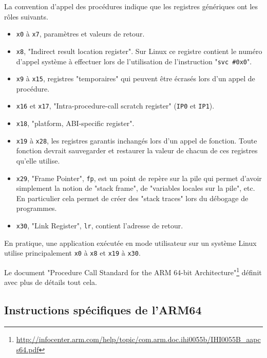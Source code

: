 \documentclass[a4paper,10pt]{article}
\begin{document}
\begin{appendices}
La convention d'appel des procédures indique que les registres génériques ont les rôles suivants.
\begin{itemize}
\item \texttt{x0} à \texttt{x7}, paramètres et valeurs de retour.
\item \texttt{x8}, "Indirect result location register". Sur Linux ce registre contient le numéro d'appel système à effectuer lors de l'utilisation de l'instruction "\texttt{svc \#0x0}".
\item \texttt{x9} à \texttt{x15}, registres "temporaires" qui peuvent être écrasés lors d'un appel de procédure.
\item \texttt{x16} et \texttt{x17}, "Intra-procedure-call scratch register" (\texttt{IP0} et \texttt{IP1}).
\item \texttt{x18}, "platform, ABI-specific register".
\item \texttt{x19} à \texttt{x28}, les registres garantis inchangés lors d'un appel de fonction. Toute fonction devrait sauvegarder et restaurer la valeur de chacun de ces registres qu'elle utilise.
\item \texttt{x29}, "Frame Pointer", \texttt{fp}, est un point de repère sur la pile qui permet d'avoir simplement la notion de "stack frame", de "variables locales sur la pile", etc. En particulier cela permet de créer des "stack traces" lors du débogage de programmes.
\item \texttt{x30}, "Link Register", \texttt{lr}, contient l'adresse de retour.
\end{itemize}
En pratique, une application exécutée en mode utilisateur sur un système Linux utilise principalement \texttt{x0} à \texttt{x8} et \texttt{x19} à \texttt{x30}.

Le document "Procedure Call Standard for the ARM 64-bit Architecture"\footnote{\url{http://infocenter.arm.com/help/topic/com.arm.doc.ihi0055b/IHI0055B_aapcs64.pdf}} définit avec plus de détails tout cela.

\subsection{Instructions spécifiques de l'ARM64}


\end{appendices}
\end{document}
